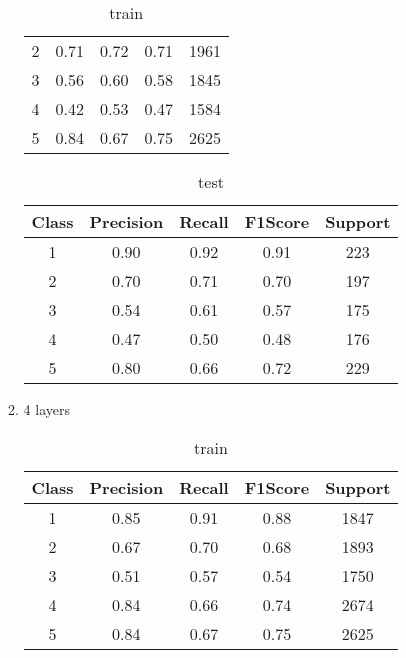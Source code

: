 \begin{enumerate}[label=(\alph*)]
\begin{enumerate}[label=\roman*.]
\begin{table}[!htb]
\begin{tabular}{ccccc}
            2     & 0.71      & 0.72   & 0.71    & 1961    \\
            3     & 0.56      & 0.60   & 0.58    & 1845    \\
            4     & 0.42      & 0.53   & 0.47    & 1584    \\
            5     & 0.84      & 0.67   & 0.75    & 2625    \\ \hline
            \end{tabular}
            \caption{train}
            \label{part c train depth 3}
        \end{table}
        \begin{table}[!htb]
            \centering
            \begin{tabular}{ccccc}
            \hline
            Class & Precision & Recall & F1Score & Support \\ \hline
            1     & 0.90      & 0.92   & 0.91    & 223     \\
            2     & 0.70      & 0.71   & 0.70    & 197     \\
            3     & 0.54      & 0.61   & 0.57    & 175     \\
            4     & 0.47      & 0.50   & 0.48    & 176     \\
            5     & 0.80      & 0.66   & 0.72    & 229     \\ \hline
            \end{tabular}
            \caption{test}
            \label{part c test depth 3}
        \end{table}
        \item 4 layers
        \begin{table}[!htb]
            \centering
            \begin{tabular}{ccccc}
            \hline
            Class & Precision & Recall & F1Score & Support \\ \hline
            1     & 0.85      & 0.91   & 0.88    & 1847    \\
            2     & 0.67      & 0.70   & 0.68    & 1893    \\
            3     & 0.51      & 0.57   & 0.54    & 1750    \\
            4     & 0.84      & 0.66   & 0.74    & 2674    \\
            5     & 0.84      & 0.67   & 0.75    & 2625    \\ \hline
            \end{tabular}
            \caption{train}
            \label{part c train depth 4}

\end{table}
\end{enumerate}
\end{enumerate}
